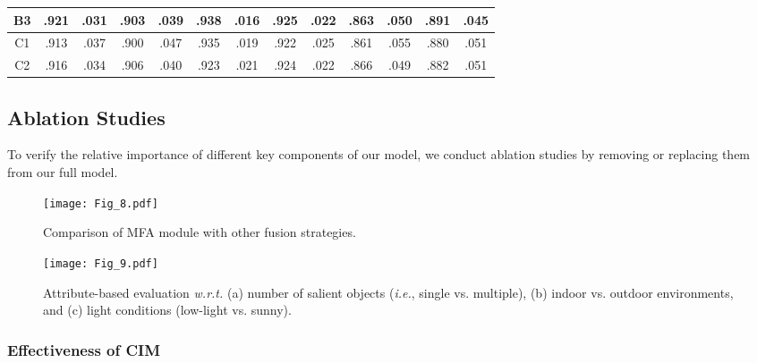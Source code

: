\documentclass[10pt,twocolumn,letterpaper]{article}
\def\ie{\emph{i.e.}}
\begin{document}
\begin{table}[t!]
\begin{tabular}{c|cc|cc|cc|cc|cc|cc}
    B3
    & .921   & .031
    & .903   & .039
    & .938   & .016
    & .925   & .022
    & .863   & .050
    & .891   & .045 	\\

    \midrule

    C1
    & .913   & .037
    & .900   & .047
    & .935   & .019
    & .922   & .025
    & .861   & .055
    & .880   & .051 	\\

    C2
    & .916   & .034
    & .906   & .040
    & .923   & .021
    & .924   & .022
    & .866   & .049
    & .882   & .051 	\\


  \bottomrule
  \hline
  \end{tabular}\label{tab5}
\end{table}



\subsection{Ablation Studies}
\label{ablation}

To verify the relative importance of different key components of our model, we conduct ablation studies by removing or replacing them from our full model.



\begin{figure}
	\begin{centering}
		\texttt{[image: Fig\_8.pdf]}
		\caption{Comparison of MFA module with other fusion strategies.}\vspace{-0.4cm}
		\label{fig08}
	\end{centering}
\end{figure}



\begin{figure*}[!t]
	\begin{centering}
		\texttt{[image: Fig\_9.pdf]}\caption{Attribute-based evaluation \emph{w.r.t.} (a) number of salient objects (\ie, single vs. multiple), (b) indoor vs. outdoor environments, and (c) light conditions (low-light vs. sunny). }\vspace{-0.35cm}
		\label{fig09}
	\end{centering}
\end{figure*}



\subsubsection{Effectiveness of CIM}
\end{document}

